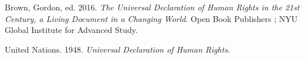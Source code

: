 \documentclass[
  english,
  american,
]{beamer}
\newlength{\cslhangindent}
\newenvironment{CSLReferences}[2] %
 {\begin{list}{}{%
  \setlength{\itemindent}{0pt}
  \setlength{\leftmargin}{0pt}
  \setlength{\parsep}{0pt}
  \ifodd #1
   \setlength{\leftmargin}{\cslhangindent}
   \setlength{\itemindent}{-1\cslhangindent}
  \fi
  \setlength{\itemsep}{#2\baselineskip}}}
 {\end{list}}
\begin{document}
\protect{}\label{refs}
\begin{CSLReferences}{1}{1}
Brown, Gordon, ed. 2016. \emph{The {Universal} {Declaration} of {Human}
{Rights} in the 21st Century, a Living Document in a Changing World}.
Open Book Publishers ; NYU Global Institute for Advanced Study.

United Nations. 1948. \emph{Universal Declaration of Human Rights}.

\end{CSLReferences}
\end{document}
